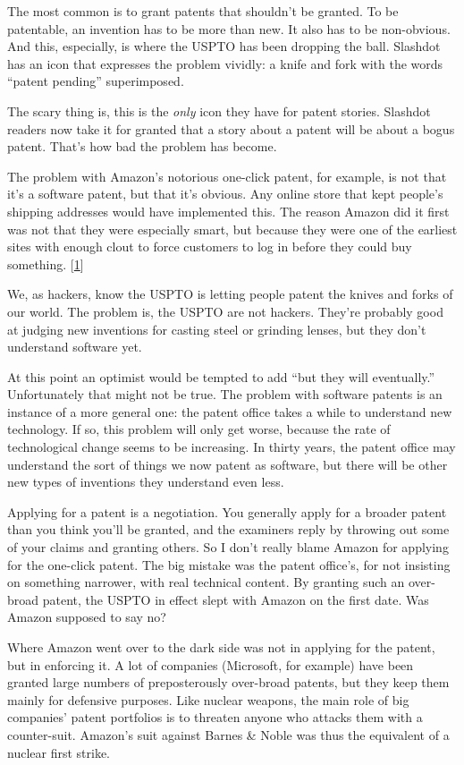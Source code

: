 The most common is to grant patents that shouldn't be granted. To be
patentable, an invention has to be more than new. It also has to be
non-obvious. And this, especially, is where the USPTO has been dropping
the ball. Slashdot has an icon that expresses the problem vividly: a
knife and fork with the words ``patent pending'' superimposed.

The scary thing is, this is the \emph{only} icon they have for patent
stories. Slashdot readers now take it for granted that a story about a
patent will be about a bogus patent. That's how bad the problem has
become.

The problem with Amazon's notorious one-click patent, for example, is
not that it's a software patent, but that it's obvious. Any online store
that kept people's shipping addresses would have implemented this. The
reason Amazon did it first was not that they were especially smart, but
because they were one of the earliest sites with enough clout to force
customers to log in before they could buy something.
{[}\hyperref[f1n]{1}{]}

We, as hackers, know the USPTO is letting people patent the knives and
forks of our world. The problem is, the USPTO are not hackers. They're
probably good at judging new inventions for casting steel or grinding
lenses, but they don't understand software yet.

At this point an optimist would be tempted to add ``but they will
eventually.'' Unfortunately that might not be true. The problem with
software patents is an instance of a more general one: the patent office
takes a while to understand new technology. If so, this problem will
only get worse, because the rate of technological change seems to be
increasing. In thirty years, the patent office may understand the sort
of things we now patent as software, but there will be other new types
of inventions they understand even less.

Applying for a patent is a negotiation. You generally apply for a
broader patent than you think you'll be granted, and the examiners reply
by throwing out some of your claims and granting others. So I don't
really blame Amazon for applying for the one-click patent. The big
mistake was the patent office's, for not insisting on something
narrower, with real technical content. By granting such an over-broad
patent, the USPTO in effect slept with Amazon on the first date. Was
Amazon supposed to say no?

Where Amazon went over to the dark side was not in applying for the
patent, but in enforcing it. A lot of companies (Microsoft, for example)
have been granted large numbers of preposterously over-broad patents,
but they keep them mainly for defensive purposes. Like nuclear weapons,
the main role of big companies' patent portfolios is to threaten anyone
who attacks them with a counter-suit. Amazon's suit against Barnes \&
Noble was thus the equivalent of a nuclear first strike.

